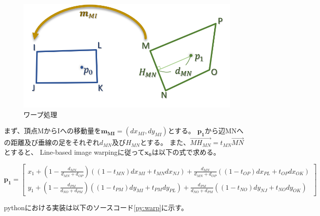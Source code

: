 \begin{figure}[h]
    \centering
    \includegraphics[width=1\linewidth]{fig/warp.png}
    \caption{ワープ処理}
    \label{fig:warp}
\end{figure}


まず、頂点MからIへの移動量を$\bm{m_{MI}} = (dx_{MI}, dy_{MI})$とする。
$\bm{p_1}$から辺MNへの距離及び垂線の足をそれぞれ$d_{MN}$及び$H_{MN}$とする。
また、$\overrightarrow{MH_{MN}}=t_{MN}\overrightarrow{MN}$とすると、
Line-based image warping\cite{}に従って$\bm{x_0}$は以下の式で求める。

\begin{equation}\label{eq:warp}
    \bm{p_1} =  \begin{bmatrix} 
                    x_1 + \left( 1 - \frac{d_{MN}}{d_{MN}+d_{OP}} \right) \left( \left( 1 - t_{MN} \right) dx_{MI} + t_{MN} dx_{NJ} \right) + \frac{d_{MN}}{d_{MN}+d_{OP}} \left( \left( 1 - t_{OP} \right) dx_{PL} + t_{OP} dx_{OK} \right) \\
                    y_1 + \left( 1 - \frac{d_{PM}}{d_{NO}+d_{PM}} \right) \left( \left( 1 - t_{PM} \right) dy_{MI} + t_{PM} dy_{PL} \right) + \frac{d_{PM}}{d_{NO}+d_{PM}} \left( \left( 1 - t_{NO} \right) dy_{NJ} + t_{NO} dy_{OK} \right)
                \end{bmatrix}
\end{equation}

pythonにおける実装は以下のソースコード\ref{py:warp}に示す。

